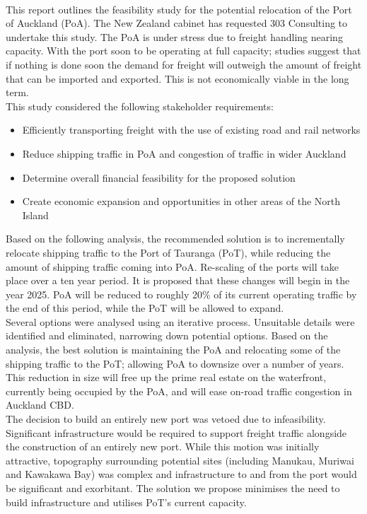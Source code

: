 \\This report outlines the feasibility study for the potential relocation of the Port of Auckland (PoA). The New Zealand cabinet has requested 303 Consulting to undertake this study. The PoA is under stress due to freight handling nearing capacity. With the port soon to be operating at full capacity; studies suggest that if nothing is done soon the demand for freight will outweigh the amount of freight that can be imported and exported. This is not economically viable in the long term. 
\vspace{-4mm}
\\ \newline This study considered the following stakeholder requirements:
\begin{itemize}[noitemsep]
    \vspace{-2mm}
    \item Efficiently transporting freight with the use of existing road and rail networks
    \item Reduce shipping traffic in PoA and congestion of traffic in wider Auckland
    \item Determine overall financial feasibility for the proposed solution
    \item Create economic expansion and opportunities in other areas of the North Island
\end{itemize}
Based on the following analysis, the recommended solution is to incrementally relocate shipping traffic to the Port of Tauranga (PoT), while reducing the amount of shipping traffic coming into PoA. Re-scaling of the ports will take place over a ten year period. It is proposed that these changes will begin in the year 2025. PoA will be reduced to roughly 20\% of its current operating traffic by the end of this period, while the PoT will be allowed to expand. 
\vspace{-4mm}
\\\newline Several options were analysed using an iterative process. Unsuitable details were identified and eliminated, narrowing down potential options. Based on the analysis, the best solution is maintaining the PoA and relocating some of the shipping traffic to the PoT; allowing PoA to downsize over a number of years. This reduction in size will free up the prime real estate on the waterfront, currently being occupied by the PoA, and will ease on-road traffic congestion in Auckland CBD.
\vspace{-4mm}
\\\newline The decision to build an entirely new port was vetoed due to infeasibility. Significant infrastructure would be required to support freight traffic alongside the construction of an entirely new port. While this motion was initially attractive, topography surrounding potential sites (including Manukau, Muriwai and Kawakawa Bay) was complex and infrastructure to and from the port would be significant and exorbitant. The solution we propose minimises the need to build infrastructure and utilises PoT’s current capacity. 
